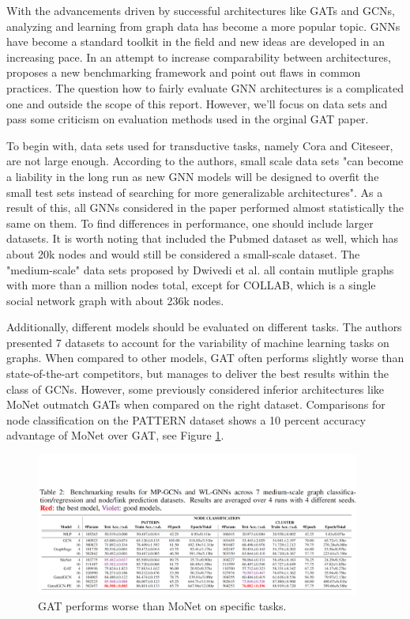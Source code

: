 \label{chapter:related_work}

With the advancements driven by successful architectures like GATs and GCNs, analyzing and learning from graph data has become a more popular topic. GNNs have become a standard toolkit in the field and new ideas are developed in an increasing pace. In an attempt to increase comparability between architectures, \cite{dwivedi2020benchmarking} proposes a new benchmarking framework and point out flaws in common practices. The question how to fairly evaluate GNN architectures is a complicated one and outside the scope of this report. However, we'll focus on data sets and pass some criticism on evaluation methods used in the orginal GAT paper.

To begin with, data sets used for transductive tasks, namely Cora and Citeseer, are not large enough. According to the authors, small scale data sets "can become a liability in the long run as new GNN models will be designed to overfit the small test sets instead of searching for more generalizable architectures". As a result of this, all GNNs considered in the paper performed almost statistically the same on them. To find differences in performance, one should include larger datasets. It is worth noting that \cite{velickovic2018graph} included the Pubmed dataset as well, which has about 20k nodes and would still be considered a small-scale dataset. The "medium-scale" data sets proposed by Dwivedi et al. all contain mutliple graphs with more than a million nodes total, except for COLLAB, which is a single social network graph with about 236k nodes.

Additionally, different models should be evaluated on different tasks.  The authors presented 7 datasets to account for the variability of machine learning tasks on graphs. When compared to other models, GAT often performs slightly worse than state-of-the-art competitors, but manages to deliver the best results within the class of GCNs. However, some previously considered inferior architectures like MoNet outmatch GATs when compared on the right dataset. Comparisons for node classification on the PATTERN dataset shows a 10 percent accuracy advantage of MoNet over GAT, see Figure \ref{fig:gat_benchmark}.

\begin{figure}[h]
    \centering
    \includegraphics[width=0.95\textwidth]{img/benchmark_gat_worse.PNG}
    \caption{GAT performs worse than MoNet on specific tasks. \cite{dwivedi2020benchmarking}}
    \label{fig:gat_benchmark}
\end{figure}